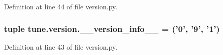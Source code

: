 Definition at line 44 of file version.\-py.

\hypertarget{namespacetune_1_1version_a255c6d51f9903b9ca1fe52113542b20c}{
\subsubsection[{\-\_\-\-\_\-version\-\_\-info\-\_\-\-\_\-}]{\setlength{\rightskip}{0pt plus 5cm}tuple tune.\-version.\-\_\-\-\_\-version\-\_\-info\-\_\-\-\_\- = ('0', '9', '1')}}\label{namespacetune_1_1version_a255c6d51f9903b9ca1fe52113542b20c}


Definition at line 43 of file version.\-py.

